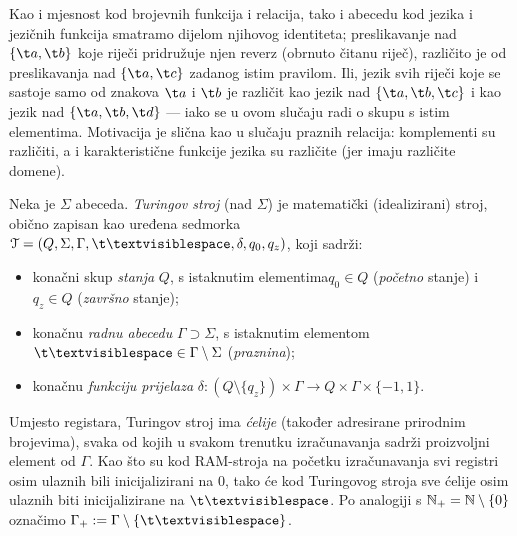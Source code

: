 \begin{napomena}[{name=[abeceda je dio identiteta jezične funkcije]}]
Kao i mjesnost kod brojevnih funkcija i relacija, tako i abecedu kod jezika i jezičnih funkcija smatramo dijelom njihovog identiteta; preslikavanje nad $\{\t a,\t b\}$ koje riječi pridružuje njen reverz (obrnuto čitanu riječ), različito je od preslikavanja nad $\{\t a,\t c\}$ zadanog istim pravilom. Ili, jezik svih riječi koje se sastoje samo od znakova $\t a$ i $\t b$ je različit kao jezik nad $\{\t a,\t b,\t c\}$ i kao jezik nad $\{\t a,\t b,\t d\}$ --- iako se u ovom slučaju radi o skupu s istim elementima. Motivacija je slična kao u slučaju praznih relacija: komplementi su različiti, a i karakteristične funkcije jezika su različite (jer imaju različite domene).
\end{napomena}

\begin{definicija}[{name=[Turingov stroj]}]
Neka je $\Sigma$ abeceda. \emph{Turingov stroj} (nad $\Sigma$) je matematički (idealizirani) stroj, obično zapisan kao uređena sedmorka $\mathcal T=(Q,\Sigma,\Gamma,\bl,\delta,q_0,q_z)$, koji sadrži:
\begin{itemize}
    \item konačni skup \emph{stanja} $Q$, s istaknutim elementima\newline $q_0\in Q$ (\emph{početno} stanje) i $q_z\in Q$ (\emph{završno} stanje);
    \item konačnu \emph{radnu abecedu} $\Gamma\supset\Sigma$, s istaknutim elementom $\bl\in\Gamma\setminus\Sigma$ (\emph{praznina});
    \item konačnu \emph{funkciju prijelaza} $\delta:(Q\setminus\{q_z\})\times\Gamma\to Q\times\Gamma\times\{-1,1\}$.\qedhere
\end{itemize}
\end{definicija}

Umjesto registara, Turingov stroj ima \emph{ćelije} (također adresirane prirodnim brojevima), svaka od kojih u svakom trenutku izračunavanja sadrži proizvoljni element od $\Gamma$. Kao što su kod RAM-stroja na početku izračunavanja svi registri osim ulaznih bili inicijalizirani na $0$, tako će kod Turingovog stroja sve ćelije osim ulaznih biti inicijalizirane na $\bl$. Po analogiji s ${\mathbb N}_+={\mathbb N}\setminus\{0\}$ označimo $\Gamma_+:=\Gamma\setminus\{\bl\}$.

